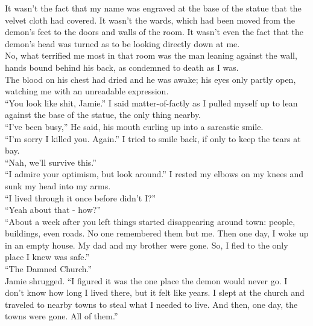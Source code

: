 \documentclass[a5paper]{scrartcl}
\begin{document}
It wasn't the fact that my name was engraved at the base of the statue that the velvet cloth had covered. It wasn't the wards, which had been moved from the demon's feet to the doors and walls of the room. It wasn't even the fact that the demon's head was turned as to be looking directly down at me.\\


No, what terrified me most in that room was the man leaning against the wall, hands bound behind his back, as condemned to death as I was.\\


The blood on his chest had dried and he was awake; his eyes only partly open, watching me with an unreadable expression.\\


\enquote{You look like shit, Jamie.} I said matter-of-factly as I pulled myself up to lean against the base of the statue, the only thing nearby.\\


\enquote{I've been busy,} He said, his mouth curling up into a sarcastic smile.\\


\enquote{I'm sorry I killed you. Again.} I tried to smile back, if only to keep the tears at bay.\\


\enquote{Nah, we'll survive this.}\\


\enquote{I admire your optimism, but look around.} I rested my elbows on my knees and sunk my head into my arms.\\


\enquote{I lived through it once before didn't I?}\\


\enquote{Yeah about that - how?}\\


\enquote{About a week after you left things started disappearing around town: people, buildings, even roads. No one remembered them but me. Then one day, I woke up in an empty house. My dad and my brother were gone. So, I fled to the only place I knew was safe.}\\


\enquote{The Damned Church.}\\


Jamie shrugged. \enquote{I figured it was the one place the demon would never go. I don't know how long I lived there, but it felt like years. I slept at the church and traveled to nearby towns to steal what I needed to live. And then, one day, the towns were gone. All of them.}\\
\end{document}
